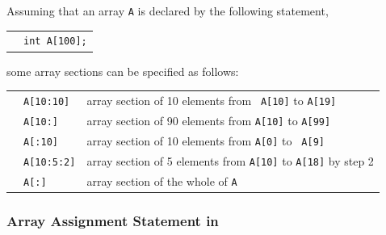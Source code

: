 Assuming that an array {\tt A} is declared by the following statement,

\vspace{0.3cm}

\begin{tabular}{ll}
\hspace{0.5cm} & {\tt int A[100];} \\
\end{tabular}

\vspace{0.3cm}

\noindent some array sections can be specified as follows:

\vspace{0.3cm}

\begin{tabular}{lll}
\hspace{0.5cm} & {\tt A[10:10]} & array section of 10 elements from {\tt
 A[10]} to {\tt A[19]} \\
 & {\tt A[10:]} & array section of 90 elements from
		  {\tt A[10]} to {\tt A[99]}\\
 & {\tt A[:10]} & array section of 10 elements from {\tt A[0]} to {\tt
	 A[9]} \\
 & {\tt A[10:5:2]} & array section of 5 elements from {\tt A[10]} to
	 {\tt A[18]} by step 2 \\
 & {\tt A[:]}      & array section of the whole of {\tt A} \\
\end{tabular}


\subsubsection{Array Assignment Statement in {\XMPC}}
\label{subsubsec:Array assignment statements in C}





